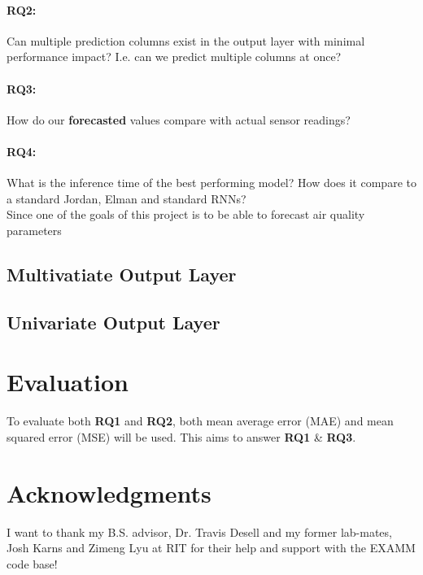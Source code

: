 \documentclass[12pt]{article}
\begin{document}
\paragraph{RQ2:} Can multiple prediction columns exist in the output layer with minimal performance impact? I.e. can we predict multiple columns at once? \\
\paragraph{RQ3:} How do our \textbf{forecasted} values compare with actual sensor readings?\\
\paragraph{RQ4:} What is the inference time of the best performing model? How does it compare to a standard Jordan, Elman and standard RNNs? \\
Since one of the goals of this project is to be able to forecast air quality parameters
\subsection{Multivatiate Output Layer}
\subsection{Univariate Output Layer}


\section{Evaluation}
To evaluate both \textbf{RQ1} and \textbf{RQ2}, both mean average error (MAE) and mean squared error (MSE) will be used. 
This aims to answer \textbf{RQ1} \& \textbf{RQ3}.

\section{Acknowledgments}
I want to thank my B.S. advisor, Dr. Travis Desell and my former lab-mates, Josh Karns and Zimeng Lyu at RIT for their help and support with the EXAMM code base!

\end{document}
